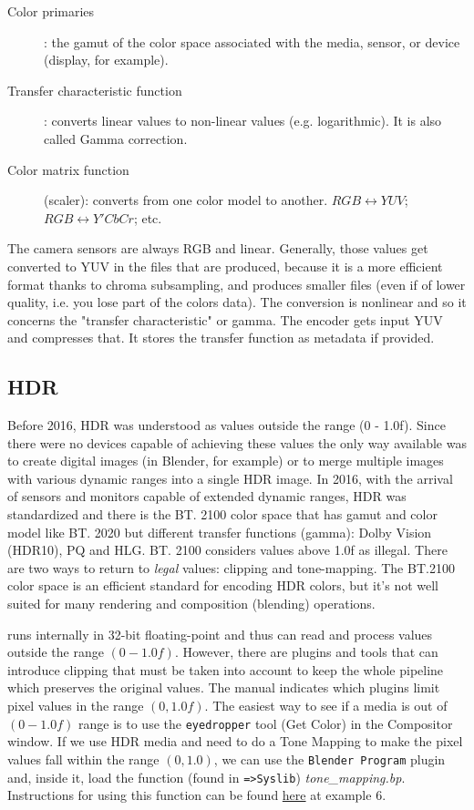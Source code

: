 \begin{description}
	\item[Color primaries]: the gamut of the color space associated with the media, sensor, or device (display, for example).
	\item[Transfer characteristic function]: converts linear values to non-linear values (e.g. logarithmic). It is also called Gamma correction.
	\item[Color matrix function] (scaler): converts from one color model to another. $RGB \leftrightarrow YUV$; $RGB \leftrightarrow Y'CbCr$; etc. 
\end{description}

The camera sensors are always RGB and linear. Generally, those values get converted to YUV in the files that are produced, because it is a more efficient format thanks to chroma subsampling, and produces smaller files (even if of lower quality, i.e. you lose part of the colors data). The conversion is nonlinear and so it concerns the "transfer characteristic" or gamma. The encoder gets input YUV and compresses that. It stores the transfer function as metadata if provided.

\subsection{HDR}%
\label{sub:hdr}

Before 2016, HDR was understood as values outside the range (0 - 1.0f). Since there were no devices capable of achieving these values the only way available was to create digital images (in Blender, for example) or to merge multiple images with various dynamic ranges into a single HDR image. In 2016, with the arrival of sensors and monitors capable of extended dynamic ranges, HDR was standardized and there is the BT. 2100 color space that has gamut and color model like BT. 2020 but different transfer functions (gamma): Dolby Vision (HDR10), PQ and HLG. BT. 2100 considers values above 1.0f as illegal. There are two ways to return to \textit{legal} values: clipping and tone-mapping. The BT.2100 color space is an efficient standard for encoding HDR colors, but it's not well suited for many rendering and composition (blending) operations.

\CGG{} runs internally in 32-bit floating-point and thus can read and process values outside the range $(0 - 1.0f)$. However, there are plugins and tools that can introduce clipping that must be taken into account to keep the whole pipeline which preserves the original values. The manual indicates which plugins limit pixel values in the range $(0, 1.0f)$. The easiest way to see if a media is out of $(0 - 1.0f)$ range is to use the \texttt{eyedropper} tool (Get Color) in the Compositor window.
If we use HDR media and need to do a Tone Mapping to make the pixel values fall within the range $(0, 1.0)$, we can use the \texttt{Blender Program} plugin and, inside it, load the function (found in \texttt{=>Syslib}) \textit{tone\_mapping.bp}. Instructions for using this function can be found \href{https://cinelerra-gg.org/download/testing/BlendPluginExamples/Examples.txt}{here} at example 6.

